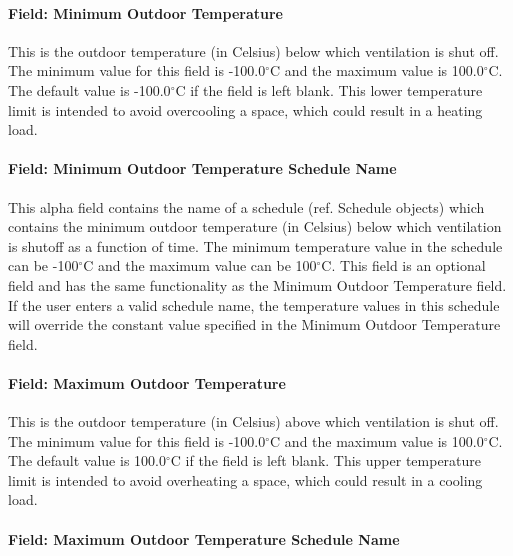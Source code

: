 \paragraph{Field: Minimum Outdoor Temperature}\label{field-minimum-outdoor-temperature-1}

This is the outdoor temperature (in Celsius) below which ventilation is shut off. The minimum value for this field is -100.0$^\circ$C and the maximum value is 100.0$^\circ$C. The default value is -100.0$^\circ$C if the field is left blank. This lower temperature limit is intended to avoid overcooling a space, which could result in a heating load.

\paragraph{Field: Minimum Outdoor Temperature Schedule Name}\label{field-minimum-outdoor-temperature-schedule-name-1}

This alpha field contains the name of a schedule (ref. Schedule objects) which contains the minimum outdoor temperature (in Celsius) below which ventilation is shutoff as a function of time. The minimum temperature value in the schedule can be -100$^\circ$C and the maximum value can be 100$^\circ$C. This field is an optional field and has the same functionality as the Minimum Outdoor Temperature field. If the user enters a valid schedule name, the temperature values in this schedule will override the constant value specified in the Minimum Outdoor Temperature field.

\paragraph{Field: Maximum Outdoor Temperature}\label{field-maximum-outdoor-temperature-1}

This is the outdoor temperature (in Celsius) above which ventilation is shut off. The minimum value for this field is -100.0$^\circ$C and the maximum value is 100.0$^\circ$C. The default value is 100.0$^\circ$C if the field is left blank. This upper temperature limit is intended to avoid overheating a space, which could result in a cooling load.

\paragraph{Field: Maximum Outdoor Temperature Schedule Name}\label{field-maximum-outdoor-temperature-schedule-name-1}

